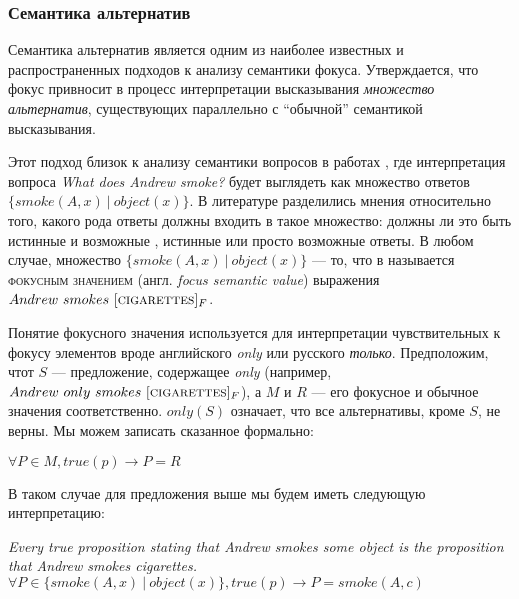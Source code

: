 \documentclass[a4paper, titlepage, 12pt]{article}
\begin{document}
\subsubsection{Семантика альтернатив \citep{rooth1985association,rooth1992theory}} \label{alternativeSemantics}

Семантика альтернатив \citep{rooth1985association,rooth1992theory} является одним из наиболее известных и распространенных подходов к анализу семантики фокуса. Утверждается, что фокус привносит в процесс интерпретации высказывания \textit{множество альтернатив}, существующих параллельно с ``обычной'' семантикой высказывания.

\medskip

Этот подход близок к анализу семантики вопросов в работах \citep{hamblin1973questions,karttunen1977syntax}, где интерпретация вопроса \textit{What does Andrew smoke?} будет выглядеть как множество ответов $ \{ smoke(A, x) \ | \ object(x) \} $. В литературе разделились мнения относительно того, какого рода ответы должны входить в такое множество: должны ли это быть истинные и возможные \citep{hamblin1973questions}, истинные \citep{karttunen1977syntax} или просто возможные \citep{groenendijk1985semantics} ответы. В любом случае, множество $ \{ smoke(A, x) \ | \ object(x) \} $ --- то, что в \citep{rooth1985association} называется \textsc{фокусным значением} (англ. \textit{focus semantic value}) выражения $ Andrew\ smokes\ [\textsc{cigarettes}]_{F} $.

\medskip

Понятие фокусного значения используется для интерпретации чувствительных к фокусу элементов вроде английского \textit{only} или русского \textit{только}. Предположим, чтот $ S $ --- предложение, содержащее \textit{only} (например, $ Andrew\ only\ smokes\ [\textsc{cigarettes}]_{F} $), а $ M $ и $ R $ --- его фокусное и обычное значения соответственно. $ only(S) $ означает, что все альтернативы, кроме $ S $, не верны. Мы можем записать сказанное формально:

\begin{exe}
    \ex \label{simpleAlternatives} $ \forall P \in M, true(p) \rightarrow P = R $
\end{exe}

В таком случае для предложения выше мы будем иметь следующую интерпретацию:

\begin{exe}
    \ex \begin{xlist}
        \ex \textit{Every true proposition stating that Andrew smokes some object is the proposition that Andrew smokes cigarettes.}
        \ex $ \forall P \in \{ smoke(A, x) \ | \ object(x) \}, true(p) \rightarrow P = smoke(A, c) $
    \end{xlist}
\end{exe}
\end{document}
